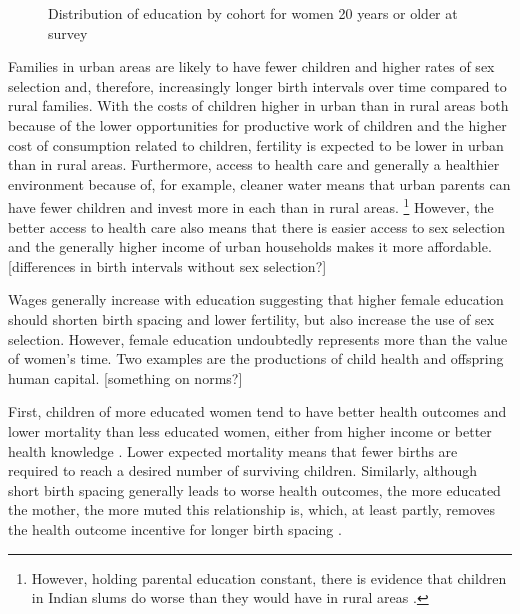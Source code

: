 \begin{figure}[htpb]
\centering
{} 
\caption{Distribution of education by cohort for women 20 years or older at survey}
\label{fig:education_over_time}
\end{figure}



Families in urban areas are likely to have fewer children and higher rates of sex 
selection and, therefore, increasingly longer birth intervals over time compared to
rural families.
With the costs of children higher in urban than in rural areas both because of the
lower opportunities for productive work of children and the higher cost of consumption
related to children, fertility is expected to be lower in urban than in rural areas.
Furthermore, access to health care and generally a healthier environment because of,
for example, cleaner water means that urban parents can have fewer children and invest
more in each than in rural areas.%
\footnote{
However, holding parental education constant, there is evidence that children in
Indian slums do worse than they would have in rural areas \citep{Portner2018a}.
}
However, the better access to health care also means that there is easier access to
sex selection and the generally higher income of urban households makes it more
affordable.
[differences in birth intervals without sex selection?]


Wages generally increase with education suggesting that higher female education
should shorten birth spacing and lower fertility, but also increase the use of sex 
selection.
However, female education undoubtedly represents more than the value of women's time.
Two examples are the productions of child health and offspring human capital.
[something on norms?]

First, children of more educated women tend to have better health outcomes and lower 
mortality than less educated women, either from higher income or better health knowledge 
\citep{Rosenzweig1982a,Kovsted2002,Whitworth2002,Maitra2008}.
Lower expected mortality means that fewer births are required to reach a desired
number of surviving children.
Similarly, although short birth spacing generally leads to worse health outcomes, 
the more educated the mother, the more muted this relationship is, which, at least partly,
removes the health outcome incentive for longer birth spacing
\citep{Whitworth2002,Conde-Agudelo2012,Molitoris2019}.

